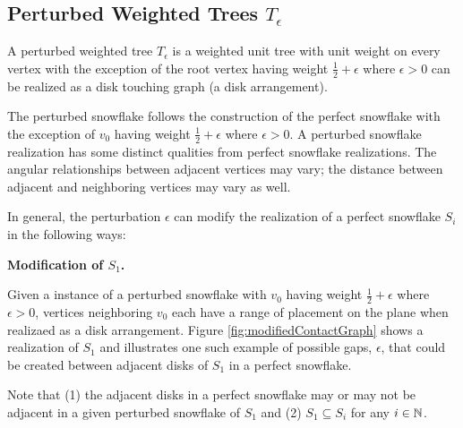 \subsection{Perturbed Weighted Trees $T_\epsilon$}

A perturbed weighted tree $T_\epsilon$ is a weighted unit tree with unit weight on every vertex with the exception of the root vertex having weight $\frac{1}{2}+\epsilon$ where $\epsilon>0$ can be realized as a disk touching graph (a disk arrangement).  

The perturbed snowflake follows the construction of the perfect snowflake with the exception of $v_0$ having weight $\frac{1}{2} + \epsilon$ where $\epsilon > 0$.
A perturbed snowflake realization has some distinct qualities from perfect snowflake realizations.  
The angular relationships between adjacent vertices may vary; the distance between adjacent and neighboring vertices may vary as well.


In general, the perturbation $\epsilon$ can modify the realization of a perfect snowflake $S_i$ in the following ways:

\textbf{Modification of $S_1$.} 

Given a instance of a perturbed snowflake with $v_0$ having weight $\frac{1}{2} + \epsilon$ where $\epsilon > 0$, vertices neighboring $v_0$ each have a range of placement on the plane when realizaed as a disk arrangement. 
Figure \ref{fig:modifiedContactGraph} shows a realization of $S_1$ and illustrates one such example of possible gaps, $\epsilon$, that could be created between adjacent disks of $S_1$ in a perfect snowflake.  

Note that (1) the adjacent disks in a perfect snowflake may or may not be adjacent in a given perturbed snowflake of $S_1$ and (2) $S_1 \subseteq S_i$ for any $i \in {\mathbb{N}}$.  


